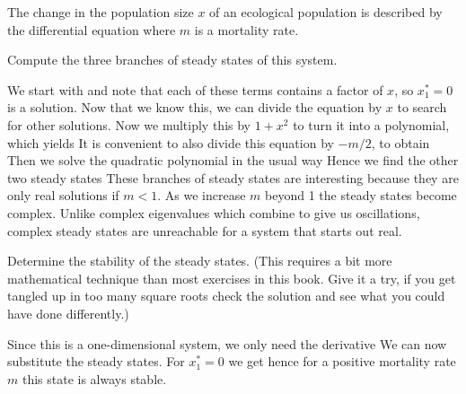 
The change in the population size $x$ of an ecological population is described by the differential equation
where $m$ is a mortality rate.

\subquestion Compute the three branches of steady states of this system. 

\solution
We start with 
and note that each of these terms contains a factor of $x$, so $x_1^*=0$ is a solution. Now that we know this, we can divide the equation by $x$ to search for other solutions.
Now we multiply this by $1+x^2$ to turn it into a polynomial, which yields
It is convenient to also divide this equation by $-m/2$, to obtain 
Then we solve the quadratic polynomial in the usual way
Hence we find the other two steady states 
These branches of steady states are interesting because they are only real solutions if $m<1$. As we increase $m$ beyond 1 the steady states become complex. Unlike complex eigenvalues which combine to give us oscillations, complex steady states are unreachable for a system that starts out real. 

\subquestion 
Determine the stability of the steady states. (This requires a bit more mathematical technique than most exercises in this book. Give it a try, if you get tangled up in too many square roots check the solution and see what you could have done differently.)

\solution
Since this is a one-dimensional system, we only need the derivative 
We can now substitute the steady states. For $x_1^*=0$ we get 
hence for a positive mortality rate $m$ this state is always stable. 

